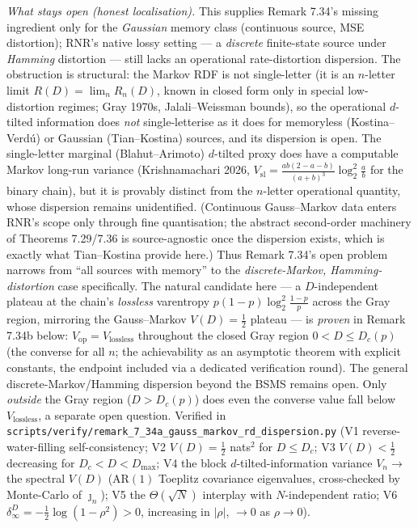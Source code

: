 \documentclass[
]{article}
\begin{document}
\emph{What stays open (honest localisation).} This supplies Remark 7.34's missing ingredient
only for the \emph{Gaussian} memory class (continuous source, MSE distortion); RNR's native
lossy setting --- a \emph{discrete} finite-state source under \emph{Hamming} distortion ---
still lacks an operational rate-distortion dispersion. The obstruction is structural: the
Markov RDF is not single-letter (it is an $n$-letter limit $R(D)=\lim_n R_n(D)$, known in
closed form only in special low-distortion regimes; Gray 1970s, Jalali--Weissman bounds), so
the operational $d$-tilted information does \emph{not} single-letterise as it does for
memoryless (Kostina--Verd\'u) or Gaussian (Tian--Kostina) sources, and its dispersion is open.
The single-letter marginal (Blahut--Arimoto) $d$-tilted proxy does have a computable Markov
long-run variance (Krishnamachari 2026, $V_{\mathrm{sl}}=\tfrac{ab(2-a-b)}{(a+b)^3}\log_2^2
\tfrac ab$ for the binary chain), but it is provably distinct from the $n$-letter operational
quantity, whose dispersion remains unidentified. (Continuous Gauss--Markov data enters
RNR's scope only through fine quantisation; the abstract second-order machinery of
Theorems 7.29/7.36 is source-agnostic once the dispersion exists, which is exactly what
Tian--Kostina provide here.) Thus Remark 7.34's open problem narrows from ``all sources with
memory'' to the \emph{discrete-Markov, Hamming-distortion} case specifically. The natural
candidate here --- a $D$-independent plateau at the chain's \emph{lossless} varentropy
$p(1-p)\log_2^2\tfrac{1-p}p$ across the Gray region, mirroring the Gauss--Markov $V(D)=\tfrac12$
plateau --- is \emph{proven} in Remark 7.34b below: $V_{\mathrm{op}}=V_{\mathrm{lossless}}$ throughout
the closed Gray region $0<D\le D_c(p)$ (the converse for all $n$; the achievability as
an asymptotic theorem with explicit constants, the endpoint included via a dedicated verification
round). The general discrete-Markov/Hamming dispersion beyond the BSMS remains open. Only
\emph{outside} the Gray region
($D>D_c(p)$) does even the converse value fall below $V_{\mathrm{lossless}}$, a separate open question.
Verified in
\texttt{scripts/verify/remark\_7\_34a\_gauss\_markov\_rd\_dispersion.py} (V1 reverse-water-filling
self-consistency; V2 $V(D)=\tfrac12$ nats$^2$ for $D\le D_c$; V3 $V(D)<\tfrac12$ decreasing for
$D_c<D<D_{\max}$; V4 the block $d$-tilted-information variance $V_n\to$ the spectral $V(D)$
(AR$(1)$ Toeplitz covariance eigenvalues, cross-checked by Monte-Carlo of $\jmath_n$); V5 the
$\Theta(\sqrt N)$ interplay with $N$-independent ratio; V6 $\delta_\infty^D=-\tfrac12\log(1-\rho^2)>0$,
increasing in $|\rho|$, $\to0$ as $\rho\to0$).
\end{document}
